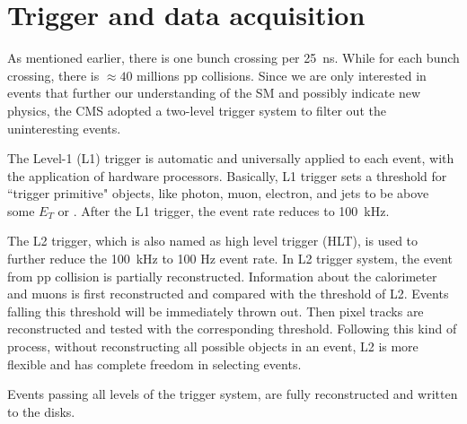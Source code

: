 \section{Trigger and data acquisition}

As mentioned earlier, there is one bunch crossing per 25~ns. While for each bunch crossing, there 
is ${\approx}40$ millions pp collisions. Since we are only interested in events that further our understanding of the SM and possibly indicate new physics,  
the CMS adopted a two-level trigger system to filter out the uninteresting events. 

The Level-1 (L1) trigger is automatic and universally applied to each event, with the application of hardware processors. Basically, L1 trigger sets a threshold for ``trigger primitive" objects, like photon, muon, electron, and jets to be above some $E_{T}$ or \pt.  After the L1 trigger, the event rate reduces to 100~kHz. 

The L2 trigger, which is also named as high level trigger (HLT), is used to further reduce the 100~kHz to 
100 Hz event rate. 
In L2 trigger system, the event from pp collision is partially reconstructed. 
Information about the calorimeter and muons is first reconstructed and compared with the threshold of L2. Events falling this threshold will be immediately thrown out. Then pixel tracks are reconstructed and tested with the corresponding threshold. Following this kind of process, without reconstructing all possible objects in an event, L2 is more flexible and has complete freedom in selecting events. 

Events passing all levels of the trigger system, are fully reconstructed and written to the disks. 
  









  



  



 
 
 





